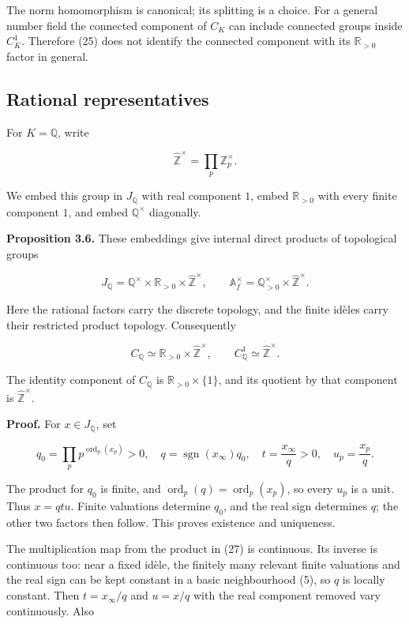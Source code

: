 \documentclass[
  english,
  11pt,
  a4paper,
]{article}
\begin{document}
The norm homomorphism is canonical; its splitting is a choice. For a
general number field the connected component of \(C_K\) can include
connected groups inside \(C_K^1\). Therefore (25) does not identify the
connected component with its \(\mathbb R_{>0}\) factor in general.

\subsection{Rational
representatives}\label{NT-ADL-03--rational-representatives}

For \(K=\mathbb Q\), write

\[\widehat{\mathbb Z}^{\times}=\prod_p\mathbb Z_p^\times.\]

We embed this group in \(J_{\mathbb Q}\) with real component \(1\),
embed \(\mathbb R_{>0}\) with every finite component \(1\), and embed
\(\mathbb Q^\times\) diagonally.

\textbf{Proposition 3.6.} These embeddings give internal direct products
of topological groups

\[J_{\mathbb Q}=\mathbb Q^\times\times\mathbb R_{>0}
\times\widehat{\mathbb Z}^{\times},
\qquad
\mathbb A_f^\times=\mathbb Q_{>0}^\times\times\widehat{\mathbb Z}^{\times}.
\tag{27}\]

Here the rational factors carry the discrete topology, and the finite
idèles carry their restricted product topology. Consequently

\[C_{\mathbb Q}\simeq\mathbb R_{>0}\times\widehat{\mathbb Z}^{\times},
\qquad C_{\mathbb Q}^1\simeq\widehat{\mathbb Z}^{\times}.
\tag{28}\]

The identity component of \(C_{\mathbb Q}\) is
\(\mathbb R_{>0}\times\{1\}\), and its quotient by that component is
\(\widehat{\mathbb Z}^{\times}\).

\textbf{Proof.} For \(x\in J_{\mathbb Q}\), set

\[q_0=\prod_p p^{\operatorname{ord}_p(x_p)}>0,
\quad q=\operatorname{sgn}(x_\infty)q_0,
\quad t=\frac{x_\infty}{q}>0,
\quad u_p=\frac{x_p}{q}.
\tag{29}\]

The product for \(q_0\) is finite, and
\(\operatorname{ord}_p(q)=\operatorname{ord}_p(x_p)\), so every \(u_p\)
is a unit. Thus \(x=qtu\). Finite valuations determine \(q_0\), and the
real sign determines \(q\); the other two factors then follow. This
proves existence and uniqueness.

The multiplication map from the product in (27) is continuous. Its
inverse is continuous too: near a fixed idèle, the finitely many
relevant finite valuations and the real sign can be kept constant in a
basic neighbourhood (5), so \(q\) is locally constant. Then
\(t=x_\infty/q\) and \(u=x/q\) with the real component removed vary
continuously. Also
\end{document}
